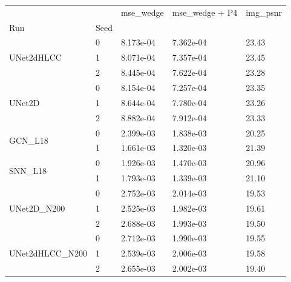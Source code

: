 \begin{tabular}{lllll}
\toprule
 &  & mse\_wedge & mse\_wedge + P4 & img\_psnr \\
Run & Seed &  &  &  \\
\midrule
\multirow[t]{3}{*}{UNet2dHLCC} & 0 & 8.173e-04 & 7.362e-04 & 23.43 \\
 & 1 & 8.071e-04 & 7.357e-04 & 23.45 \\
 & 2 & 8.445e-04 & 7.622e-04 & 23.28 \\
\cline{1-5}
\multirow[t]{3}{*}{UNet2D} & 0 & 8.154e-04 & 7.257e-04 & 23.35 \\
 & 1 & 8.644e-04 & 7.780e-04 & 23.26 \\
 & 2 & 8.882e-04 & 7.912e-04 & 23.33 \\
\cline{1-5}
\multirow[t]{2}{*}{GCN\_L18} & 0 & 2.399e-03 & 1.838e-03 & 20.25 \\
 & 1 & 1.661e-03 & 1.320e-03 & 21.39 \\
\cline{1-5}
\multirow[t]{2}{*}{SNN\_L18} & 0 & 1.926e-03 & 1.470e-03 & 20.96 \\
 & 1 & 1.793e-03 & 1.339e-03 & 21.10 \\
\cline{1-5}
\multirow[t]{3}{*}{UNet2D\_N200} & 0 & 2.752e-03 & 2.014e-03 & 19.53 \\
 & 1 & 2.525e-03 & 1.982e-03 & 19.61 \\
 & 2 & 2.688e-03 & 1.993e-03 & 19.50 \\
\cline{1-5}
\multirow[t]{3}{*}{UNet2dHLCC\_N200} & 0 & 2.712e-03 & 1.990e-03 & 19.55 \\
 & 1 & 2.539e-03 & 2.006e-03 & 19.58 \\
 & 2 & 2.655e-03 & 2.002e-03 & 19.40 \\
\cline{1-5}
\bottomrule
\end{tabular}
